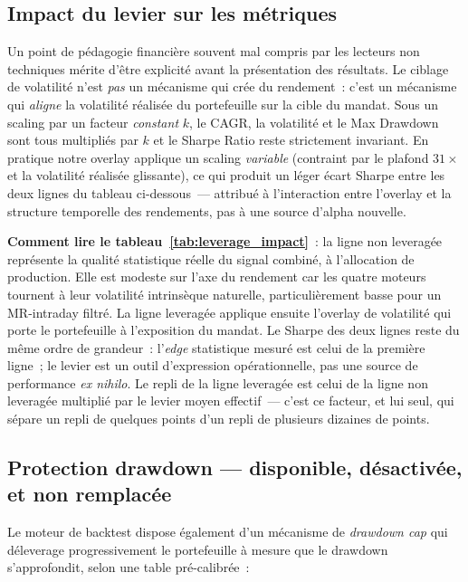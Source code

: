 \subsection{Impact du levier sur les métriques}
\label{sec:leverage_impact}

Un point de pédagogie financière souvent mal compris par les lecteurs non techniques mérite d'être explicité avant la présentation des résultats. Le ciblage de volatilité n'est \emph{pas} un mécanisme qui crée du rendement~: c'est un mécanisme qui \emph{aligne} la volatilité réalisée du portefeuille sur la cible du mandat. Sous un scaling par un facteur \emph{constant} $k$, le CAGR, la volatilité et le Max Drawdown sont tous multipliés par $k$ et le Sharpe Ratio reste strictement invariant. En pratique notre overlay applique un scaling \emph{variable} (contraint par le plafond $31\times$ et la volatilité réalisée glissante), ce qui produit un léger écart Sharpe entre les deux lignes du tableau ci-dessous~--- attribué à l'interaction entre l'overlay et la structure temporelle des rendements, pas à une source d'alpha nouvelle.



\begin{insightbox}
\textbf{Comment lire le tableau~\ref{tab:leverage_impact}}~: la ligne non leveragée représente la qualité statistique réelle du signal combiné, à l'allocation de production. Elle est modeste sur l'axe du rendement car les quatre moteurs tournent à leur volatilité intrinsèque naturelle, particulièrement basse pour un MR-intraday filtré. La ligne leveragée applique ensuite l'overlay de volatilité qui porte le portefeuille à l'exposition du mandat. Le Sharpe des deux lignes reste du même ordre de grandeur~: l'\emph{edge} statistique mesuré est celui de la première ligne~; le levier est un outil d'expression opérationnelle, pas une source de performance \emph{ex nihilo}. Le repli de la ligne leveragée est celui de la ligne non leveragée multiplié par le levier moyen effectif~--- c'est ce facteur, et lui seul, qui sépare un repli de quelques points d'un repli de plusieurs dizaines de points.
\end{insightbox}

\subsection{Protection drawdown --- disponible, désactivée, et non remplacée}

Le moteur de backtest dispose également d'un mécanisme de \emph{drawdown cap} qui déleverage progressivement le portefeuille à mesure que le drawdown s'approfondit, selon une table pré-calibrée~:


